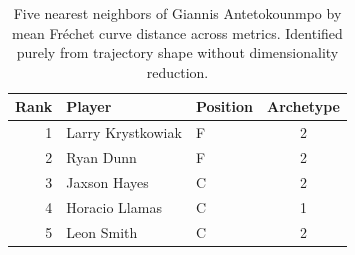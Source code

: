 \begin{table}[htbp]
  \centering\small
  \begin{tabular}{rllc}
    \toprule
    Rank & Player & Position & Archetype \\
    \midrule
    1 & Larry Krystkowiak & F & 2 \\
    2 & Ryan Dunn & F & 2 \\
    3 & Jaxson Hayes & C & 2 \\
    4 & Horacio Llamas & C & 1 \\
    5 & Leon Smith & C & 2 \\
    \bottomrule
  \end{tabular}
  \caption{Five nearest neighbors of Giannis Antetokounmpo by mean Fr\'{e}chet curve distance across metrics. Identified purely from trajectory shape without dimensionality reduction.}
  \label{tab:Giannis_Antetokounmpo_frechet_curve_neighbors}
\end{table}

